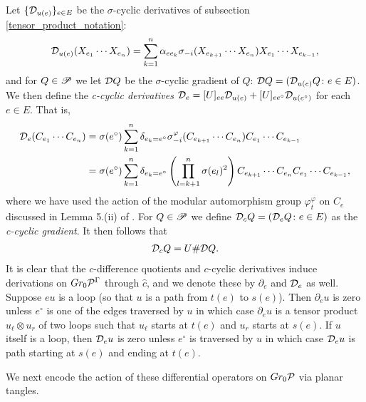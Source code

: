 Let $\{\D_{u(e)}\}_{e\in E}$ be the $\sigma$-cyclic derivatives of subsection \ref{tensor_product_notation}:
	\begin{align*}
		\D_{u(e)}(X_{e_1}\cdots X_{e_n})=\sum_{k=1}^n \alpha_{e e_k} \sigma_{-i}(X_{e_{k+1}}\cdots X_{e_n}) X_{e_1}\cdots X_{e_{k-1}},
	\end{align*}
and for $Q\in \P$ we let $\D Q$ be the $\sigma$-cyclic gradient of $Q$: $\D Q=(\D_{u(e)} Q\colon e\in E)$. We then define the \emph{c-cyclic derivatives} $\D_e = [U]_{ee}\D_{u(e)}+[U]_{ee^\circ}\D_{u(e^\circ)}$ for each $e\in E$. That is,
	\begin{align*}
		\D_e(C_{e_1}\cdots C_{e_n})&=\sigma(e^\circ)\sum_{k=1}^n \delta_{e_k=e^\circ} \sigma_{-i}^\varphi(C_{e_{k+1}}\cdots C_{e_n}) C_{e_1}\cdots C_{e_{k-1}}\\
			&=\sigma(e^\circ) \sum_{k=1}^n \delta_{e_k=e^\circ} \left(\prod_{l=k+1}^n \sigma(e_l)^2\right)C_{e_{k+1}}\cdots C_{e_n}C_{e_1}\cdots C_{e_{k-1}},
	\end{align*}
where we have used the action of the modular automorphism group $\varphi_t^\varphi$ on $C_e$ discussed in Lemma 5.(ii) of \cite{GJS10}. For $Q\in \P$ we define $\D_c Q=(\D_e Q\colon e\in E)$ as the \emph{c-cyclic gradient}. It then follows that
	\begin{align}\label{linear_relation_derivative2}
		\D_c Q=U \#\D Q.
	\end{align}
It is clear that the $c$-difference quotients and $c$-cyclic derivatives induce derivations on $Gr_0 \mc{P}^\Gamma$ through $\hat{c}$, and we denote these by $\partial_e$ and $\D_e$ as well. Suppose $eu$ is a loop (so that $u$ is a path from $t(e)$ to $s(e)$). Then $\partial_e u$ is zero unless $e^\circ$ is one of the edges traversed by $u$ in which case $\partial_e u$ is a tensor product $u_{\ell}\otimes u_r$ of two loops such that $u_{\ell}$ starts at $t(e)$ and $u_r$ starts at $s(e)$. If $u$ itself is a loop, then $\D_e u$ is zero unless $e^\circ$ is traversed by $u$ in which case $\D_e u$ is path starting at $s(e)$ and ending at $t(e)$.

We next encode the action of these differential operators on $Gr_0\mc{P}$ via planar tangles.

